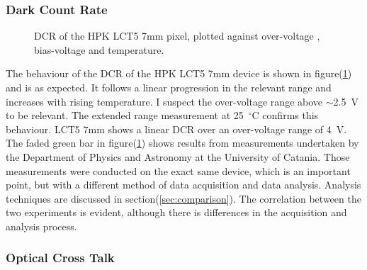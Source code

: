 \documentclass[12pt,article,type=msc,colorback,accentcolor=tud9c]{tudthesis}
\begin{document}
\subsubsection{Dark Count Rate}
\label{subsubsec:LCT57DCR}
\begin{figure}[t!]
\begin{centering}
\caption[LCT5 7mm DCR]{DCR of the HPK LCT5 7mm pixel, plotted against over-voltage , bias-voltage and temperature.}
\label{fig:LCT57_DCR}
\end{centering}
\end{figure}
The behaviour of the DCR of the HPK LCT5 7mm device is shown in figure(\ref{fig:LCT57_DCR}) and is as expected. It follows a linear progression in the relevant range and increases with rising temperature. I suspect the over-voltage range above $\sim$2.5~V to be relevant. The extended range measurement at 25~$^\circ$C confirms this behaviour. LCT5 7mm shows a linear DCR over an over-voltage range of 4~V. The faded green bar in figure(\ref{fig:LCT57_DCR}) shows results from measurements undertaken by the Department of Physics and Astronomy at the University of Catania. Those measurements were conducted on the exact same device, which is an important point, but with a different method of data acquisition and data analysis. Analysis techniques are discussed in section(\ref{sec:comparison}). The correlation between the two experiments is evident, although there is differences in the acquisition and analysis process.


\subsubsection{Optical Cross Talk}
\end{document}
